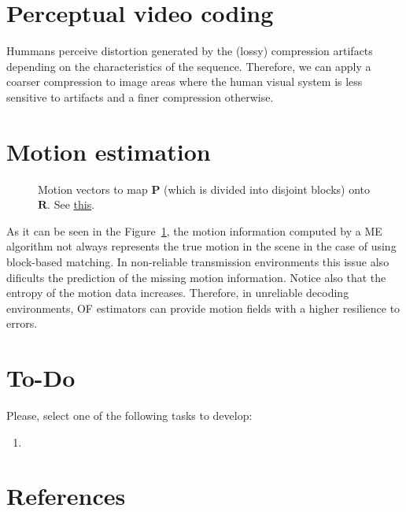 \section{Perceptual video coding}
Hummans perceive distortion generated by the (lossy) compression
artifacts depending on the characteristics of the sequence. Therefore,
we can apply a coarser compression to image areas where the human
visual system is less sensitive to artifacts and a finer compression
otherwise.

\section{Motion estimation}
\begin{figure}
  \centering
  \caption{Motion vectors to map ${\mathbf P}$ (which is divided into
    disjoint blocks) onto ${\mathbf R}$. See
    \href{https://github.com/Sistemas-Multimedia/Sistemas-Multimedia.github.io/blob/master/milestones/09-ME/full_search_block_ME.ipynb}{this}.}
  \label{fig:MVs_block}
\end{figure}

As it can be seen in the Figure~\ref{fig:MVs_block}, the motion
information computed by a ME algorithm not always represents the true
motion in the scene in the case of using block-based matching. In
non-reliable transmission environments this issue also dificults the
prediction of the missing motion information. Notice also that the
entropy of the motion data increases. Therefore, in unreliable
decoding environments, OF estimators can provide motion fields with a
higher resilience to errors.

\section{To-Do}
Please, select one of the following tasks to develop:
\begin{enumerate}
\item
\end{enumerate}

\section{References}

\renewcommand{\addcontentsline}[3]{}%

